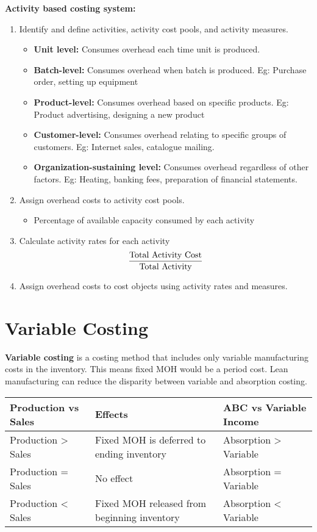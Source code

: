 \documentclass[english, 12pt]{article}
\begin{document}
\begin{mthd}
\textbf{Activity based costing system:}
\begin{enumerate}
\item Identify and define activities, activity cost pools, and activity measures.
\begin{itemize}
\item \textbf{Unit level:} Consumes overhead each time unit is produced.
\item \textbf{Batch-level:} Consumes overhead when batch is produced. Eg: Purchase order, setting up equipment
\item \textbf{Product-level:} Consumes overhead based on specific products. Eg: Product advertising, designing a new product
\item \textbf{Customer-level:} Consumes overhead relating to specific groups of customers. Eg: Internet sales, catalogue mailing.
\item \textbf{Organization-sustaining level:} Consumes overhead regardless of other factors. Eg: Heating, banking fees, preparation of financial statements.
\end{itemize}
\item Assign overhead costs to activity cost pools.
\begin{itemize}
\item Percentage of available capacity consumed by each activity
\end{itemize}
\item Calculate activity rates for each activity
\[\frac{\text{Total Activity Cost}}{\text{Total Activity}}\]
\item Assign overhead costs to cost objects using activity rates and measures.
\end{enumerate}
\end{mthd}

\section{Variable Costing}

\begin{defn}
\textbf{Variable costing} is a costing method that includes only variable manufacturing costs in the inventory. This means fixed MOH would be a period cost. Lean manufacturing can reduce the disparity between variable and absorption costing.
\end{defn}

\begin{tabular}{|l|l|l|}
\hline
Production vs Sales & Effects & ABC vs Variable Income \\
\hline
Production > Sales & Fixed MOH is deferred to ending inventory & Absorption > Variable \\
Production = Sales & No effect & Absorption = Variable \\
Production < Sales & Fixed MOH released from beginning inventory & Absorption < Variable\\
\hline
\end{tabular}
\end{document}
